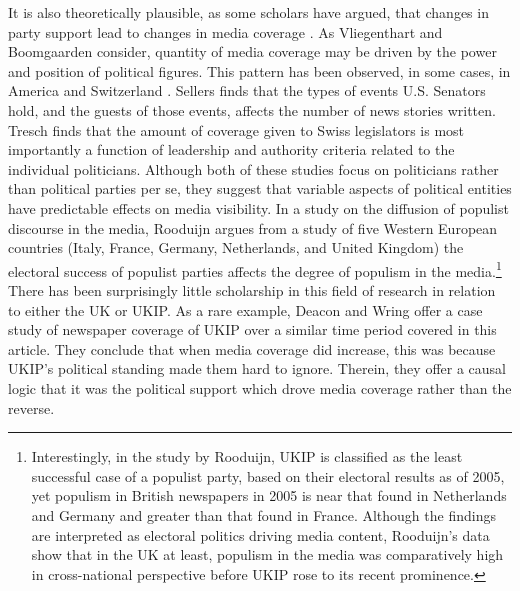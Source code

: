 \documentclass[12pt,]{article}
\begin{document}
It is also theoretically plausible, as some scholars have argued, that
changes in party support lead to changes in media coverage
\citep{pauwels_reassessing_2010}. As Vliegenthart and Boomgaarden
\citeyearpar{vliegenthart_why_2010} consider, quantity of media coverage
may be driven by the power and position of political figures. This
pattern has been observed, in some cases, in America
\citep{sellers_winning_2007} and Switzerland
\citep{tresch_politicians_2009}. Sellers
\citeyearpar{sellers_winning_2007} finds that the types of events U.S.
Senators hold, and the guests of those events, affects the number of
news stories written. Tresch \citeyearpar{tresch_politicians_2009} finds
that the amount of coverage given to Swiss legislators is most
importantly a function of leadership and authority criteria related to
the individual politicians. Although both of these studies focus on
politicians rather than political parties per se, they suggest that
variable aspects of political entities have predictable effects on media
visibility. In a study on the diffusion of populist discourse in the
media, Rooduijn \citeyearpar{rooduijn_mesmerising_2014} argues from a
study of five Western European countries (Italy, France, Germany,
Netherlands, and United Kingdom) the electoral success of populist
parties affects the degree of populism in the
media.\footnote{Interestingly, in the study by Rooduijn, UKIP is classified as the least successful case of a populist party, based on their electoral results as of 2005, yet populism in British newspapers in 2005 is near that found in Netherlands and Germany and greater than that found in France. Although the findings are interpreted as electoral politics driving media content, Rooduijn's data show that in the UK at least, populism in the media was comparatively high in cross-national perspective before UKIP rose to its recent prominence.}
There has been surprisingly little scholarship in this field of research
in relation to either the UK or UKIP. As a rare example, Deacon and
Wring \citeyearpar{deacon_uk_2015} offer a case study of newspaper
coverage of UKIP over a similar time period covered in this article.
They conclude that when media coverage did increase, this was because
UKIP's political standing made them hard to ignore. Therein, they offer
a causal logic that it was the political support which drove media
coverage rather than the reverse.
\end{document}
